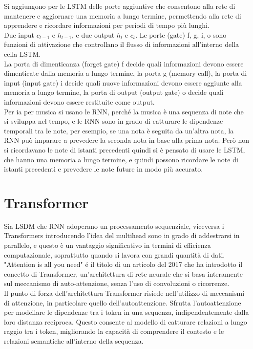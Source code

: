 Si aggiungono per le LSTM delle porte aggiuntive che consentono alla rete di mantenere e aggiornare una memoria a lungo termine, permettendo alla rete di apprendere e ricordare informazioni 
per periodi di tempo più lunghi.\\
Due input $c_{t-1}$ e $h_{t-1}$, e due output $h_t$ e $c_t$. Le porte (gate) f, g, i, o sono funzioni di attivazione che controllano il flusso di informazioni all'interno della cella LSTM.\\
La porta di dimenticanza (forget gate) f decide quali informazioni devono essere dimenticate dalla memoria a lungo termine, la porta g (memory call), la porta di input (input gate) i decide quali nuove informazioni devono essere
aggiunte alla memoria a lungo termine, la porta di output (output gate) o decide quali informazioni devono essere restituite come output.\\

Per ia per musica si usano le RNN, perché la musica è una sequenza di note che si sviluppa nel tempo, e le RNN sono in grado di catturare le dipendenze temporali tra le note,
per esempio, se una nota è seguita da un'altra nota, la RNN può imparare a prevedere la seconda nota in base alla prima nota. Però non si ricordavano le note di istanti precedenti 
quindi si è pensato di usare le LSTM, che hanno una memoria a lungo termine, e quindi possono ricordare le note di istanti precedenti e prevedere le note future in modo più accurato.\\

\section{Transformer}

Sia LSDM che RNN adoperano un processamento sequenziale, viceversa i Transformers introducendo l'idea del multihead sono in grado di addestrarsi in parallelo, 
e questo è un vantaggio significativo in termini di efficienza computazionale, soprattutto quando si lavora con grandi quantità di dati.\\

"Attention is all you need" é il titolo di un articolo del 2017 che ha introdotto il concetto di Transformer, un'architettura di rete neurale che si basa interamente sul meccanismo di auto-attenzione, senza l'uso di convoluzioni o ricorrenze.\\

Il punto di forza dell'architettura Transformer risiede nell'utilizzo di meccanismi di attenzione, in particolare quello dell'autoattenzione. Sfrutta l'autoattenzione per modellare le 
dipendenze tra i token in una sequenza, indipendentemente dalla loro distanza reciproca. Questo consente al modello di catturare relazioni a lungo raggio tra i token, migliorando la capacità di comprendere il contesto e le relazioni semantiche all'interno della sequenza.\\

